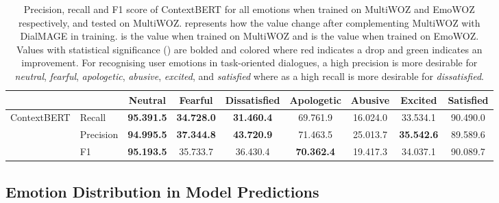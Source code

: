 \documentclass[10pt, a4paper]{article}
\begin{document}
\begin{table}[H]
\centering
\footnotesize
\setlength\tabcolsep{3pt}
\begin{tabular}{l|l|ccccccc}
\toprule[1pt]
 &  & Neutral & Fearful & Dissatisfied & Apologetic & Abusive & Excited & Satisfied \\ \hline
\multirow{3}{*}{ContextBERT} & Recall & \textbf{\color{red} 95.391.5} & \textbf{\color{red} 34.728.0} & \textbf{\color[HTML]{009b55} 31.460.4} & 69.761.9 & 16.024.0 & 33.534.1 & 90.490.0 \\
 & Precision & \textbf{\color[HTML]{009b55}94.995.5} & \textbf{\color[HTML]{009b55} 37.344.8} & \textbf{\color{red} 43.720.9} & 71.463.5 & 25.013.7 & \textbf{\color[HTML]{009b55} 35.542.6} & 89.589.6 \\
 & F1 & \textbf{\color{red} 95.193.5} & 35.733.7 & 36.430.4 & \textbf{\color{red} 70.362.4} & 19.417.3 & 34.037.1 & 90.089.7 \\
\bottomrule[1pt]
\end{tabular}
\caption{Precision, recall and F1 score of ContextBERT for all emotions when trained on MultiWOZ and EmoWOZ respectively, and tested on MultiWOZ.  represents how the value change after complementing MultiWOZ with DialMAGE in training.  is the value when trained on MultiWOZ and  is the value when trained on EmoWOZ. Values with statistical significance () are bolded and colored where red indicates a drop and green indicates an improvement. For recognising user emotions in task-oriented dialogues, a high precision is more desirable for \textit{neutral}, \textit{fearful}, \textit{apologetic}, \textit{abusive}, \textit{excited}, and \textit{satisfied} where as a high recall is more desirable for \textit{dissatisfied}. \label{tab:precision-recall-full}}

\end{table}


\subsection{Emotion Distribution in Model Predictions}
\label{sec:emo-dist-model-pred}
\end{document}
